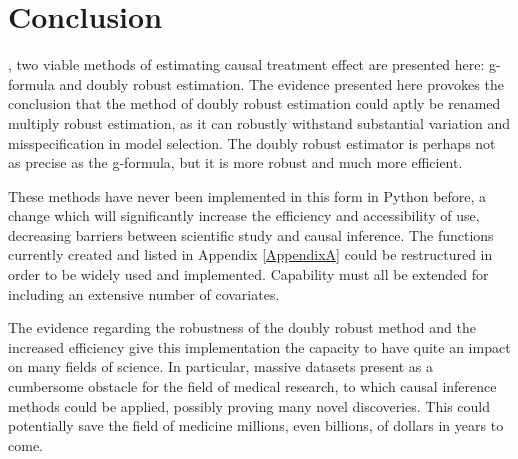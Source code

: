 \chapter{Conclusion}
\label{conclusion}

, two viable methods of estimating causal treatment effect are presented here: g-formula and doubly robust estimation.  The evidence presented here provokes the conclusion that the method of doubly robust estimation could aptly be renamed multiply robust estimation, as it can robustly withstand substantial variation and misspecification in model selection.  The doubly robust estimator is perhaps not as precise as the g-formula, but it is more robust and much more efficient. 

These methods have never been implemented in this form in Python before, a change which will significantly increase the efficiency and accessibility of use, decreasing barriers between scientific study and causal inference.  The functions currently created and listed in Appendix \ref{AppendixA} could be restructured in order to be widely used and implemented.  Capability must all be extended for including an extensive number of covariates.  

The evidence regarding the robustness of the doubly robust method and the increased efficiency give this implementation the capacity to have quite an impact on many fields of science.  In particular, massive datasets present as a cumbersome obstacle for the field of medical research, to which causal inference methods could be applied, possibly proving many novel discoveries.  This could potentially save the field of medicine millions, even billions, of dollars in years to come.  

